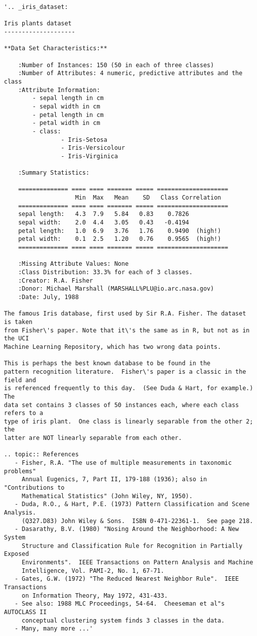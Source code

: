 \begin{lstlisting}[numbers=none]
'.. _iris_dataset:

Iris plants dataset
--------------------

**Data Set Characteristics:**

    :Number of Instances: 150 (50 in each of three classes)    
    :Number of Attributes: 4 numeric, predictive attributes and the class
    :Attribute Information:
        - sepal length in cm
        - sepal width in cm
        - petal length in cm
        - petal width in cm
        - class:
                - Iris-Setosa
                - Iris-Versicolour
                - Iris-Virginica
                
    :Summary Statistics:
    
    ============== ==== ==== ======= ===== ====================
                    Min  Max   Mean    SD   Class Correlation
    ============== ==== ==== ======= ===== ====================
    sepal length:   4.3  7.9   5.84   0.83    0.7826
    sepal width:    2.0  4.4   3.05   0.43   -0.4194
    petal length:   1.0  6.9   3.76   1.76    0.9490  (high!)
    petal width:    0.1  2.5   1.20   0.76    0.9565  (high!)
    ============== ==== ==== ======= ===== ====================
    
    :Missing Attribute Values: None
    :Class Distribution: 33.3% for each of 3 classes.
    :Creator: R.A. Fisher
    :Donor: Michael Marshall (MARSHALL%PLU@io.arc.nasa.gov)
    :Date: July, 1988
    
The famous Iris database, first used by Sir R.A. Fisher. The dataset is taken
from Fisher\'s paper. Note that it\'s the same as in R, but not as in the UCI
Machine Learning Repository, which has two wrong data points.

This is perhaps the best known database to be found in the
pattern recognition literature.  Fisher\'s paper is a classic in the field and
is referenced frequently to this day.  (See Duda & Hart, for example.)  The
data set contains 3 classes of 50 instances each, where each class refers to a
type of iris plant.  One class is linearly separable from the other 2; the
latter are NOT linearly separable from each other.

.. topic:: References
   - Fisher, R.A. "The use of multiple measurements in taxonomic problems"
     Annual Eugenics, 7, Part II, 179-188 (1936); also in "Contributions to
     Mathematical Statistics" (John Wiley, NY, 1950).
   - Duda, R.O., & Hart, P.E. (1973) Pattern Classification and Scene Analysis.
     (Q327.D83) John Wiley & Sons.  ISBN 0-471-22361-1.  See page 218.
   - Dasarathy, B.V. (1980) "Nosing Around the Neighborhood: A New System
     Structure and Classification Rule for Recognition in Partially Exposed
     Environments".  IEEE Transactions on Pattern Analysis and Machine
     Intelligence, Vol. PAMI-2, No. 1, 67-71.
   - Gates, G.W. (1972) "The Reduced Nearest Neighbor Rule".  IEEE Transactions
     on Information Theory, May 1972, 431-433.
   - See also: 1988 MLC Proceedings, 54-64.  Cheeseman et al"s AUTOCLASS II
     conceptual clustering system finds 3 classes in the data.
   - Many, many more ...'
\end{lstlisting}

